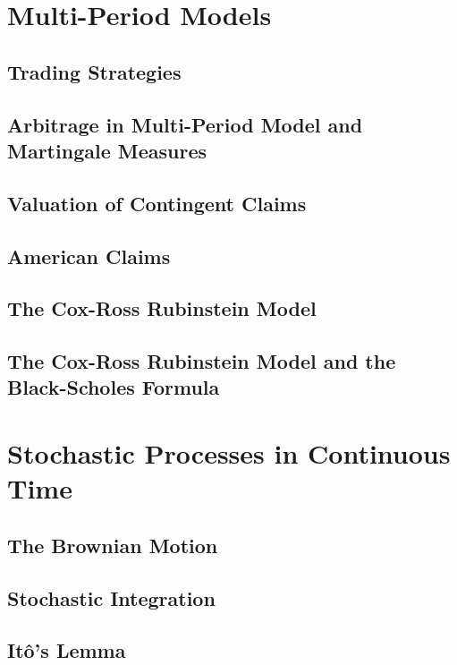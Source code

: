 \documentclass[11pt,a4paper]{article}
\begin{document}
\section{Multi-Period Models} \label{sec_multi_period_models}

\subsection{Trading Strategies}

\subsection{Arbitrage in Multi-Period Model and Martingale Measures}

\subsection{Valuation of Contingent Claims}

\subsection{American Claims}

\subsection{The Cox-Ross Rubinstein Model}

\subsection{The Cox-Ross Rubinstein Model and the Black-Scholes Formula}

\section{Stochastic Processes in Continuous Time} \label{sec_stochastic_processes_in_continuous_time}

\subsection{The Brownian Motion}

\subsection{Stochastic Integration}

\subsection{It\^o's Lemma}
\end{document}

